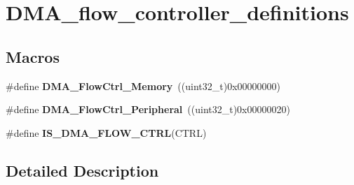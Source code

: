 \hypertarget{group___d_m_a__flow__controller__definitions}{\section{D\-M\-A\-\_\-flow\-\_\-controller\-\_\-definitions}
\label{group___d_m_a__flow__controller__definitions}
}
\subsection*{Macros}
\begin{DoxyCompactItemize}
\item 
\hypertarget{group___d_m_a__flow__controller__definitions_gafe69109789c2c285f98193f4b598cbc1}{\#define {\bfseries D\-M\-A\-\_\-\-Flow\-Ctrl\-\_\-\-Memory}~((uint32\-\_\-t)0x00000000)}\label{group___d_m_a__flow__controller__definitions_gafe69109789c2c285f98193f4b598cbc1}

\item 
\hypertarget{group___d_m_a__flow__controller__definitions_ga33a735d51a2b790a25c579753edddd46}{\#define {\bfseries D\-M\-A\-\_\-\-Flow\-Ctrl\-\_\-\-Peripheral}~((uint32\-\_\-t)0x00000020)}\label{group___d_m_a__flow__controller__definitions_ga33a735d51a2b790a25c579753edddd46}

\item 
\#define {\bfseries I\-S\-\_\-\-D\-M\-A\-\_\-\-F\-L\-O\-W\-\_\-\-C\-T\-R\-L}(C\-T\-R\-L)
\end{DoxyCompactItemize}


\subsection{Detailed Description}


